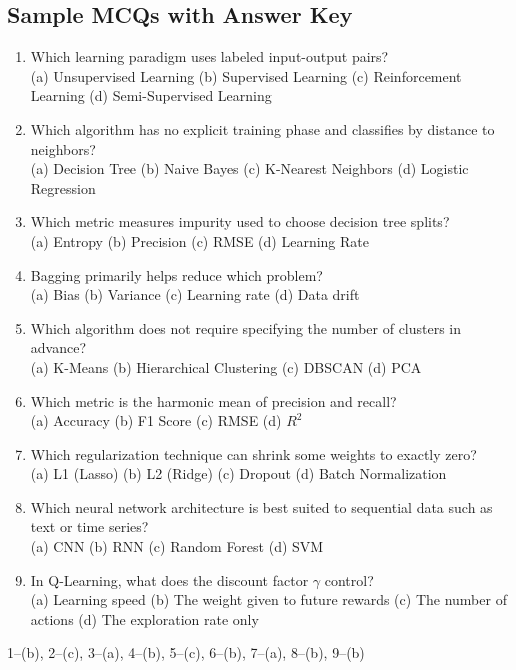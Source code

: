 \documentclass[11pt,a4paper]{article}
\begin{document}
\subsection{Sample MCQs with Answer Key}
\begin{enumerate}[leftmargin=*]
  \item Which learning paradigm uses labeled input-output pairs?\\
  (a) Unsupervised Learning \quad (b) Supervised Learning \quad (c) Reinforcement Learning \quad (d) Semi-Supervised Learning
  \item Which algorithm has no explicit training phase and classifies by distance to neighbors?\\
  (a) Decision Tree \quad (b) Naive Bayes \quad (c) K-Nearest Neighbors \quad (d) Logistic Regression
  \item Which metric measures impurity used to choose decision tree splits?\\
  (a) Entropy \quad (b) Precision \quad (c) RMSE \quad (d) Learning Rate
  \item Bagging primarily helps reduce which problem?\\
  (a) Bias \quad (b) Variance \quad (c) Learning rate \quad (d) Data drift
  \item Which algorithm does not require specifying the number of clusters in advance?\\
  (a) K-Means \quad (b) Hierarchical Clustering \quad (c) DBSCAN \quad (d) PCA
  \item Which metric is the harmonic mean of precision and recall?\\
  (a) Accuracy \quad (b) F1 Score \quad (c) RMSE \quad (d) $R^2$
  \item Which regularization technique can shrink some weights to exactly zero?\\
  (a) L1 (Lasso) \quad (b) L2 (Ridge) \quad (c) Dropout \quad (d) Batch Normalization
  \item Which neural network architecture is best suited to sequential data such as text or time series?\\
  (a) CNN \quad (b) RNN \quad (c) Random Forest \quad (d) SVM
  \item In Q-Learning, what does the discount factor $\gamma$ control?\\
  (a) Learning speed \quad (b) The weight given to future rewards \quad (c) The number of actions \quad (d) The exploration rate only
\end{enumerate}
\begin{conceptbox}
1--(b), 2--(c), 3--(a), 4--(b), 5--(c), 6--(b), 7--(a), 8--(b), 9--(b)
\end{conceptbox}
\end{document}
